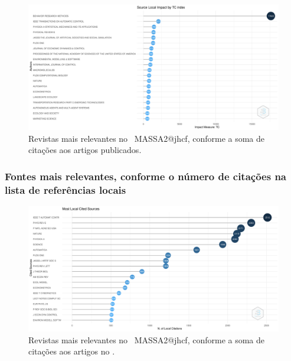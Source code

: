 \begin{figure}
    \centering
    \includegraphics[width=1\textwidth]{experiments/jhcf/PesqBibliogr/SimulacaoMultiagente/WoS-20220203/Metricas/Sources/MASSA2-Total-Citation-Source-Local-Impact.png.png}
    \caption{Revistas mais relevantes no  \dataset\ MASSA2@jhcf, conforme a soma de citações aos artigos publicados.}
    \label{fig:MASSA2-Total-Citation-Source-Local-Impact.png}
\end{figure}

\subsubsection{Fontes mais relevantes, conforme o número de citações na lista de referências locais}

\begin{figure}
    \centering
    \includegraphics[width=1\textwidth]{experiments/jhcf/PesqBibliogr/SimulacaoMultiagente/WoS-20220203/Metricas/Sources/MASSA2-Most-Local-Cited-Sources(from-Reference-Lists).png}
    \caption{Revistas mais relevantes no  \dataset\ MASSA2@jhcf, conforme a soma de citações aos artigos no \dataset.}
    \label{fig:MASSA2-Most-Local-Cited-Sources(from-Reference-Lists).png}
\end{figure}

